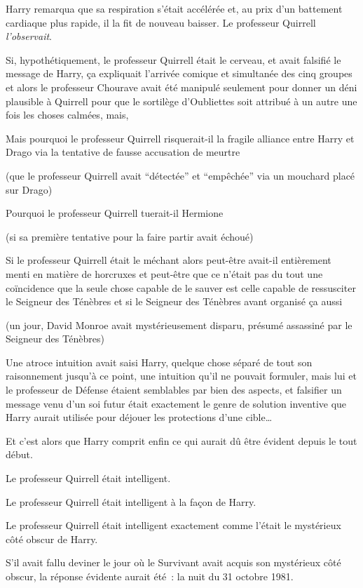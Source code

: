Harry remarqua que sa respiration s'était accélérée et, au prix d'un battement cardiaque plus rapide, il la fit de nouveau baisser.
Le professeur Quirrell \emph{l'observait}.

Si, hypothétiquement, le professeur Quirrell était le cerveau, et avait falsifié le message de Harry, ça expliquait l'arrivée comique et simultanée des cinq groupes et alors le professeur Chourave avait été manipulé seulement pour donner un déni plausible à Quirrell pour que le sortilège d'Oubliettes soit attribué à un autre une fois les choses calmées, mais,

Mais pourquoi le professeur Quirrell risquerait-il la fragile alliance entre Harry et Drago via la tentative de fausse accusation de meurtre

(que le professeur Quirrell avait “détectée” et “empêchée” via un mouchard placé sur Drago)

Pourquoi le professeur Quirrell tuerait-il Hermione

(si sa première tentative pour la faire partir avait échoué)

Si le professeur Quirrell était le méchant alors peut-être avait-il entièrement menti en matière de horcruxes et peut-être que ce n'était pas du tout une coïncidence que la seule chose capable de le sauver est celle capable de ressusciter le Seigneur des Ténèbres et si le Seigneur des Ténèbres avant organisé ça aussi

(un jour, David Monroe avait mystérieusement disparu, présumé assassiné par le Seigneur des Ténèbres)

Une atroce intuition avait saisi Harry, quelque chose séparé de tout son raisonnement jusqu'à ce point, une intuition qu'il ne pouvait formuler, mais lui et le professeur de Défense étaient semblables par bien des aspects, et falsifier un message venu d'un soi futur était exactement le genre de solution inventive que Harry aurait utilisée pour déjouer les protections d'une cible…

Et c'est alors que Harry comprit enfin ce qui aurait dû être évident depuis le tout début.

\later

Le professeur Quirrell était intelligent.

Le professeur Quirrell était intelligent à la façon de Harry.

Le professeur Quirrell était intelligent exactement comme l'était le mystérieux côté obscur de Harry.

S'il avait fallu deviner le jour où le Survivant avait acquis son mystérieux côté obscur, la réponse évidente aurait été~: la nuit du 31 octobre 1981.

